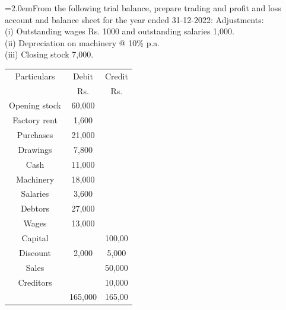 \documentclass[11pt,a4paper]{article}
\newcommand{\lqn}[2]{\Needspace{6\baselineskip}\par\medskip\noindent\hangindent=2.0em\hangafter=1\makebox[2.0em][l]{\textbf{#1.}}#2\par}
\begin{document}
\lqn{98}{From the following trial balance, prepare trading and profit and loss account and balance sheet for the year ended 31-12-2022: Adjustments:\\
(i) Outstanding wages Rs. 1000 and outstanding salaries 1,000.\\
(ii) Depreciation on machinery @ 10\% p.a.\\
(iii) Closing stock 7,000.\par
\par\smallskip\noindent\hspace*{1.2em}\begin{tabular}{|ccc|}
\hline
Particulars & Debit & Credit \\
 & Rs. & Rs. \\
Opening stock & 60,000 &  \\
Factory rent & 1,600 &  \\
Purchases & 21,000 &  \\
Drawings & 7,800 &  \\
Cash & 11,000 &  \\
Machinery & 18,000 &  \\
Salaries & 3,600 &  \\
Debtors & 27,000 &  \\
Wages & 13,000 &  \\
Capital &  & 100,00 \\
Discount & 2,000 & 5,000 \\
Sales &  & 50,000 \\
Creditors &  & 10,000 \\
 & 165,000 & 165,00 \\
\hline
\end{tabular}\par\smallskip
}
\end{document}
